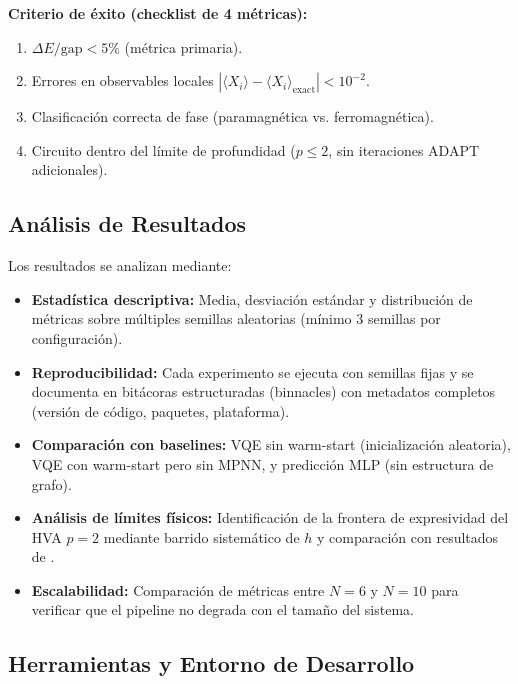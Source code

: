 \documentclass[11pt,a4paper,spanish]{book}
\begin{document}
\textbf{Criterio de éxito (checklist de 4 métricas):}
\begin{enumerate}
    \item $\Delta E/\text{gap} < 5\%$ (métrica primaria).
    \item Errores en observables locales $|\langle X_i \rangle - \langle X_i \rangle_{\text{exact}}| < 10^{-2}$.
    \item Clasificación correcta de fase (paramagnética vs. ferromagnética).
    \item Circuito dentro del límite de profundidad ($p \leq 2$, sin iteraciones ADAPT adicionales).
\end{enumerate}

\subsection{Análisis de Resultados}

Los resultados se analizan mediante:

\begin{itemize}
    \item \textbf{Estadística descriptiva:} Media, desviación estándar y distribución de métricas sobre múltiples semillas aleatorias (mínimo 3 semillas por configuración).
    \item \textbf{Reproducibilidad:} Cada experimento se ejecuta con semillas fijas y se documenta en bitácoras estructuradas (binnacles) con metadatos completos (versión de código, paquetes, plataforma).
    \item \textbf{Comparación con baselines:} VQE sin warm-start (inicialización aleatoria), VQE con warm-start pero sin MPNN, y predicción MLP (sin estructura de grafo).
    \item \textbf{Análisis de límites físicos:} Identificación de la frontera de expresividad del HVA $p = 2$ mediante barrido sistemático de $h$ y comparación con resultados de \citet{tripathi2026}.
    \item \textbf{Escalabilidad:} Comparación de métricas entre $N = 6$ y $N = 10$ para verificar que el pipeline no degrada con el tamaño del sistema.
\end{itemize}

\subsection{Herramientas y Entorno de Desarrollo}
\end{document}
